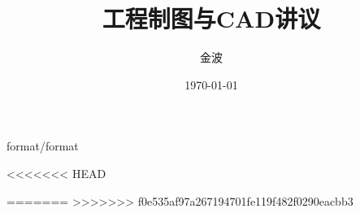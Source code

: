 \documentclass[12pt,twoside]{book}
\begin{document}
\begin{CJK}{UTF8}{song}
 {format/format}
\title{工程制图与CAD讲议}
\author{金波}
\date{\today}
\maketitle
\CJKtilde
\frontmatter
\tableofcontents
\mainmatter
\graphicspath{{cad/pdf/}{cad/png/}}





<<<<<<< HEAD






=======
% 
% 
% 
>>>>>>> f0e535af97a267194701fe119f482f0290eacbb3
% 
% 
% 
% 
% 
% 
% 
% 
% 
% 
% 
% 
%
%

\newpage
\end{CJK}
\end{document}
